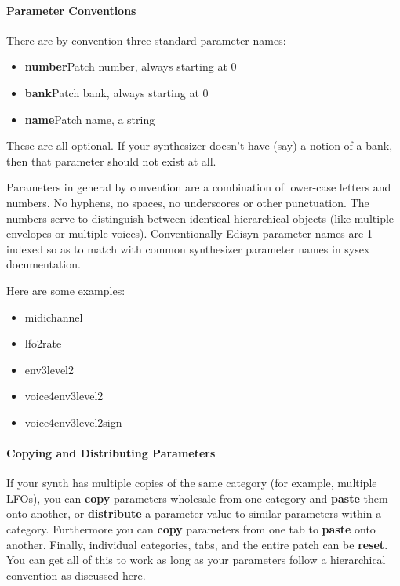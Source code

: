 \documentclass{article}
\begin{document}
\paragraph{Parameter Conventions}

There are by convention three standard parameter names:

\begin{itemize}
\item {\bf number}\quad Patch number, always starting at 0
\item {\bf bank}\quad Patch bank, always starting at 0
\item {\bf name}\quad Patch name, a string
\end{itemize}

These are all optional.  If your synthesizer doesn't have (say) a notion of a bank, then that parameter should not exist at all.

Parameters in general by convention are a combination of lower-case letters and numbers.  No hyphens, no spaces, no underscores or other punctuation.  The numbers serve to distinguish between identical hierarchical objects (like multiple envelopes or multiple voices).  Conventionally Edisyn parameter names are 1-indexed so as to match with common synthesizer parameter names in sysex documentation.

Here are some examples:

\begin{itemize}
\item midichannel
\item lfo2rate
\item env3level2
\item voice4env3level2
\item voice4env3level2sign
\end{itemize}


\paragraph{Copying and Distributing Parameters}

If your synth has multiple copies of the same category (for example, multiple LFOs), you can {\bf copy} parameters wholesale from one category and {\bf paste} them onto another, or {\bf distribute} a parameter value to similar parameters within a category.  Furthermore you can {\bf copy} parameters from one tab to {\bf paste} onto another.  Finally, individual categories, tabs, and the entire patch can be {\bf reset}.    You can get all of this to work as long as your parameters follow a hierarchical convention as discussed here.
\end{document}

